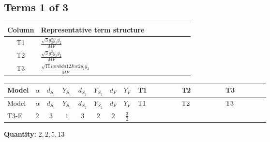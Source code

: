 \documentclass[8pt]{article}
\begin{document}
\begin{landscape}
\subsection*{Terms 1 of 3}
\begin{center}
\begin{tabular}{@{}c >{\raggedright\arraybackslash}p{0.82\linewidth}@{}}
\toprule
Column & Representative term structure \\
\midrule
T1 & \(\displaystyle \frac{\sqrt{3} g_{2}^{2} \overline{y_{1}} \overline{y_{2}}}{MF}\) \\
\midrule
T2 & \(\displaystyle \frac{\sqrt{3} g_{1}^{2} \overline{y_{1}} \overline{y_{2}}}{MF}\) \\
\midrule
T3 & \(\displaystyle \frac{\sqrt{11} lambda12Inv2 \overline{y_{1}} \overline{y_{2}}}{MF}\) \\
\midrule
\bottomrule
\end{tabular}
\end{center}
\smallskip
\tiny
\begin{longtable}{@{}llcccccc >{\raggedright\arraybackslash}p{0.21\linewidth} >{\raggedright\arraybackslash}p{0.21\linewidth} >{\raggedright\arraybackslash}p{0.21\linewidth}@{}}
\toprule
Model & $\alpha$ & $d_{S_1}$ & $Y_{S_1}$ & $d_{S_2}$ & $Y_{S_2}$ & $d_F$ & $Y_F$ & T1 & T2 & T3 \\
\midrule
\endfirsthead
\toprule
Model & $\alpha$ & $d_{S_1}$ & $Y_{S_1}$ & $d_{S_2}$ & $Y_{S_2}$ & $d_F$ & $Y_F$ & T1 & T2 & T3 \\
\midrule
\endhead
T3-E & $2$ & $3$ & $1$ & $3$ & $2$ & $2$ & $\frac{3}{2}$ & \scriptsize\adjustbox{max width=\linewidth}{$\begin{gathered} - \frac{49 \sqrt{3} g_{2}^{2} \overline{y_{1}} \overline{y_{2}}}{24 MF}\end{gathered}$} & \scriptsize\adjustbox{max width=\linewidth}{$\begin{gathered} - \frac{9 \sqrt{3} g_{1}^{2} \overline{y_{1}} \overline{y_{2}}}{8 MF}\end{gathered}$} & \scriptsize\adjustbox{max width=\linewidth}{$\begin{gathered} - \frac{3 \sqrt{11} lambda12Inv2 \overline{y_{1}} \overline{y_{2}}}{22 MF}\end{gathered}$} \\
\midrule
\bottomrule
\end{longtable}
\clearpage
\noindent\textbf{Quantity: }$\mathrm{2,2,5,13}$\par\smallskip

\end{landscape}
\end{document}
